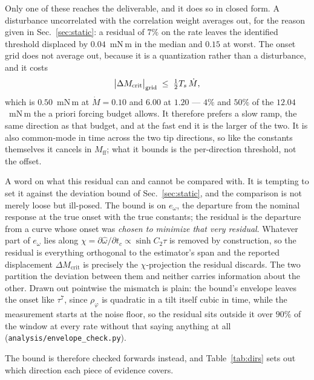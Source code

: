 \documentclass[10pt]{article}
\begin{document}
Only one of these reaches the deliverable, and it does so in closed
form. A disturbance uncorrelated with the correlation weight averages
out, for the reason given in Sec.~\ref{sec:static}: a residual of $7\%$
on the rate leaves the identified threshold displaced by $0.04$~mN\,m
in the median and $0.15$ at worst. The onset grid does not average out,
because it is a quantization rather than a disturbance, and it costs
\begin{equation}
\bigl|\Delta M_{\mathrm{crit}}\bigr|_{\rm grid}
\;\le\; \tfrac12 T_s\,\dot M ,
\label{eq:grid}
\end{equation}
which is $0.50$~mN\,m at $\dot M = 0.10$ and $6.00$ at $1.20$ — $4\%$
and $50\%$ of the $12.04$~mN\,m the a priori forcing budget allows.
It therefore prefers a slow ramp, the same direction as that budget,
and at the fast end it is the larger of the two. It is also common-mode
in time across the two tip directions, so like the constants themselves
it cancels in $M_{\mathrm{ff}}$; what it bounds is the per-direction
threshold, not the offset.

A word on what this residual can and cannot be compared with. It is
tempting to set it against the deviation bound of Sec.~\ref{sec:static},
and the comparison is not merely loose but ill-posed. The bound is on
$e_\omega$, the departure from the nominal response at the true onset
with the true constants; the residual is the departure from a curve
whose onset was \emph{chosen to minimize that very residual}. Whatever
part of $e_\omega$ lies along $\chi = \partial\hat\omega/\partial t_c
\propto \sinh C_2\tau$ is removed by construction, so the residual is
everything orthogonal to the estimator's span and the reported
displacement $\Delta M_{\mathrm{crit}}$ is precisely the
$\chi$-projection the residual discards. The two partition the
deviation between them and neither carries information about the other.
Drawn out pointwise the mismatch is plain: the bound's envelope leaves
the onset like $\tau^7$, since $\rho_\varphi$ is quadratic in a tilt
itself cubic in time, while the measurement starts at the noise floor,
so the residual sits outside it over $90\%$ of the window at every rate
without that saying anything at all
(\texttt{analysis/envelope\_check.py}).

The bound is therefore checked forwards instead, and Table~\ref{tab:dirs}
sets out which direction each piece of evidence covers.
\end{document}
